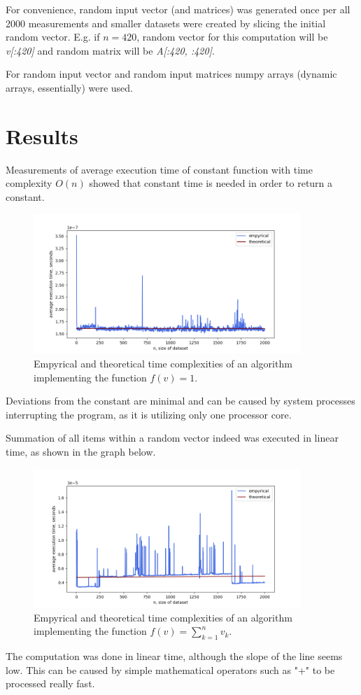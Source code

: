 \documentclass[12pt, a4paper]{article}
\begin{document}
For convenience, random input vector (and matrices) was generated once per all 2000 measurements and smaller datasets were created by slicing the initial random vector. E.g. if $n=420$, random vector for this computation will be \textit{v[:420]} and random matrix will be \textit{A[:420, :420]}.

For random input vector and random input matrices numpy arrays (dynamic arrays, essentially) were used.

\newpage

\section*{Results}

Measurements of average execution time of constant function with time complexity $O(n)$ showed that constant time is needed in order to return a constant.
\begin{figure}[!h]
\centering
\includegraphics[width=0.9\textwidth]{const.png}
\caption{Empyrical and theoretical time complexities of an algorithm implementing the function $f(v)=1$.}
\end{figure}
Deviations from the constant are minimal and can be caused by system processes interrupting the program, as it is utilizing only one processor core.

Summation of all items within a random vector indeed was executed in linear time, as shown in the graph below.
\begin{figure}[!h]
\centering
\includegraphics[width=0.9\textwidth]{sum.png}
\caption{Empyrical and theoretical time complexities of an algorithm implementing the function $f(v)=\sum_{k=1}^{n} v_k$.}
\end{figure}
The computation was done in linear time, although the slope of the line seems low. This can be caused by simple mathematical operators such as "+" to be processed really fast.
\end{document}
